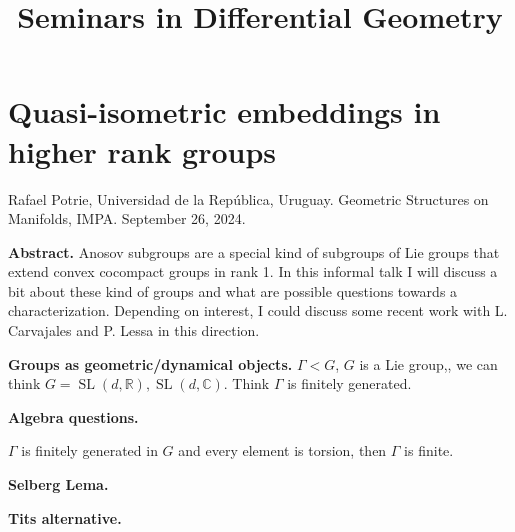 







\title{Seminars in Differential Geometry}

\maketitle




\label{section-phantom}



\tableofcontents



\section{Quasi-isometric embeddings in higher
rank groups}
\label{section-potrie-qi-higher-rank}

\noindent
Rafael Potrie, Universidad de la República,
Uruguay. Geometric Structures on Manifolds,
IMPA. September 26, 2024.

\medskip\noindent
{\bf Abstract.}
Anosov subgroups are a special kind of
subgroups of Lie groups that extend convex
cocompact groups in rank 1. In this informal
talk I will discuss a bit about these kind of
groups and what are possible questions
towards a characterization. Depending on
interest, I could discuss some recent work
with L. Carvajales and P. Lessa in this
direction.

\medskip\noindent
{\bf Groups as geometric/dynamical objects.}
$\Gamma<G$, $G$ is a Lie group,, we can think
$G=\operatorname{SL}(d,\mathbb{R}),
\operatorname{SL}(d,\mathbb{C})$.
Think $\Gamma$ is finitely generated.

\medskip\noindent
{\bf Algebra questions.}

\begin{remark}
\label{remark-potrie-burnside}
$\Gamma$ is finitely generated in $G$ and
every element is torsion, then $\Gamma$ is
finite.
\end{remark}

\medskip\noindent
{\bf Selberg Lema.}

\medskip\noindent
{\bf Tits alternative.}


